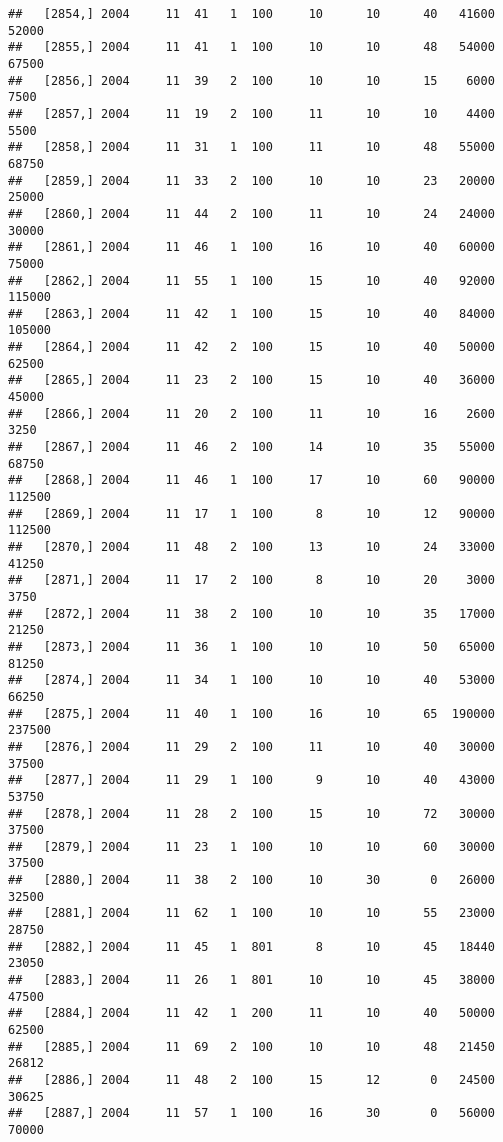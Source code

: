 \documentclass{article}\usepackage[]{graphicx}\usepackage[]{color}
\makeatletter
\newenvironment{kframe}{%
 \def\at@end@of@kframe{}%
 \ifinner\ifhmode%
  \def\at@end@of@kframe{\end{minipage}}%
  \begin{minipage}{\columnwidth}%
 \fi\fi%
 \def\FrameCommand##1{\hskip\@totalleftmargin \hskip-\fboxsep
 \colorbox{shadecolor}{##1}\hskip-\fboxsep
     \hskip-\linewidth \hskip-\@totalleftmargin \hskip\columnwidth}%
 \MakeFramed {\advance\hsize-\width
   \@totalleftmargin\z@ \linewidth\hsize
   \@setminipage}}%
 {\par\unskip\endMakeFramed%
 \at@end@of@kframe}
\newenvironment{knitrout}{}{} %
\makeatother
\begin{document}
\begin{knitrout}
\begin{kframe}
\begin{verbatim}
##   [2854,] 2004     11  41   1  100     10      10      40   41600   52000
##   [2855,] 2004     11  41   1  100     10      10      48   54000   67500
##   [2856,] 2004     11  39   2  100     10      10      15    6000    7500
##   [2857,] 2004     11  19   2  100     11      10      10    4400    5500
##   [2858,] 2004     11  31   1  100     11      10      48   55000   68750
##   [2859,] 2004     11  33   2  100     10      10      23   20000   25000
##   [2860,] 2004     11  44   2  100     11      10      24   24000   30000
##   [2861,] 2004     11  46   1  100     16      10      40   60000   75000
##   [2862,] 2004     11  55   1  100     15      10      40   92000  115000
##   [2863,] 2004     11  42   1  100     15      10      40   84000  105000
##   [2864,] 2004     11  42   2  100     15      10      40   50000   62500
##   [2865,] 2004     11  23   2  100     15      10      40   36000   45000
##   [2866,] 2004     11  20   2  100     11      10      16    2600    3250
##   [2867,] 2004     11  46   2  100     14      10      35   55000   68750
##   [2868,] 2004     11  46   1  100     17      10      60   90000  112500
##   [2869,] 2004     11  17   1  100      8      10      12   90000  112500
##   [2870,] 2004     11  48   2  100     13      10      24   33000   41250
##   [2871,] 2004     11  17   2  100      8      10      20    3000    3750
##   [2872,] 2004     11  38   2  100     10      10      35   17000   21250
##   [2873,] 2004     11  36   1  100     10      10      50   65000   81250
##   [2874,] 2004     11  34   1  100     10      10      40   53000   66250
##   [2875,] 2004     11  40   1  100     16      10      65  190000  237500
##   [2876,] 2004     11  29   2  100     11      10      40   30000   37500
##   [2877,] 2004     11  29   1  100      9      10      40   43000   53750
##   [2878,] 2004     11  28   2  100     15      10      72   30000   37500
##   [2879,] 2004     11  23   1  100     10      10      60   30000   37500
##   [2880,] 2004     11  38   2  100     10      30       0   26000   32500
##   [2881,] 2004     11  62   1  100     10      10      55   23000   28750
##   [2882,] 2004     11  45   1  801      8      10      45   18440   23050
##   [2883,] 2004     11  26   1  801     10      10      45   38000   47500
##   [2884,] 2004     11  42   1  200     11      10      40   50000   62500
##   [2885,] 2004     11  69   2  100     10      10      48   21450   26812
##   [2886,] 2004     11  48   2  100     15      12       0   24500   30625
##   [2887,] 2004     11  57   1  100     16      30       0   56000   70000

\end{verbatim}
\end{kframe}
\end{knitrout}
\end{document}
